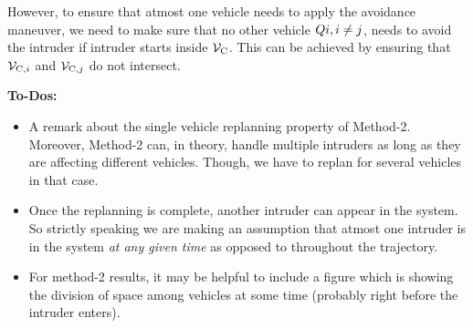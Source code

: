 However, to ensure that atmost one vehicle needs to apply the avoidance maneuver, we need to make sure that no other vehicle $Q{i}, i \neq j$, needs to avoid the intruder if intruder starts inside $\mathcal{V}_\text{C}$. This can  be achieved by ensuring that $\mathcal{V}_{\text{C},i}$ and $\mathcal{V}_{\text{C},j}$ do not intersect.

\textbf{To-Dos:}
\begin{itemize}
\item A remark about the single vehicle replanning property of Method-2. Moreover, Method-2 can, in theory, handle multiple intruders as long as they are affecting different vehicles. Though, we have to replan for several vehicles in that case. 
\item Once the replanning is complete, another intruder can appear in the system. So strictly speaking we are making an assumption that atmost one intruder is in the system \textit{at any given time} as opposed to throughout the trajectory.
\item For method-2 results, it may be helpful to include a figure which is showing the division of space among vehicles at some time (probably right before the intruder enters). 
\end{itemize}
